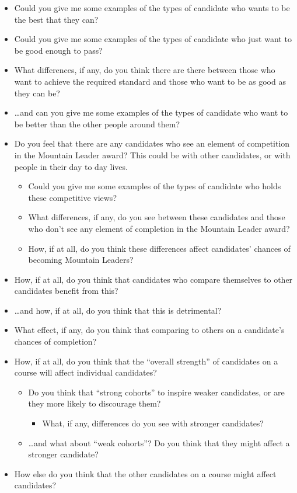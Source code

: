 \documentclass[
  12pt,
  a4paper,
]{book}
\providecommand{\tightlist}{%
  \setlength{\itemsep}{0pt}\setlength{\parskip}{0pt}}
\begin{document}
\begin{itemize}
\tightlist
\item
  Could you give me some examples of the types of candidate who wants to be the best that they can?
\item
  Could you give me some examples of the types of candidate who just want to be good enough to pass?
\item
  What differences, if any, do you think there are there between those who want to achieve the required standard and those who want to be as good as they can be?
\item
  \ldots and can you give me some examples of the types of candidate who want to be better than the other people around them?
\item
  Do you feel that there are any candidates who see an element of competition in the Mountain Leader award? This could be with other candidates, or with people in their day to day lives.

  \begin{itemize}
  \tightlist
  \item
    Could you give me some examples of the types of candidate who holds these competitive views?
  \item
    What differences, if any, do you see between these candidates and those who don't see any element of completion in the Mountain Leader award?
  \item
    How, if at all, do you think these differences affect candidates' chances of becoming Mountain Leaders?
  \end{itemize}
\item
  How, if at all, do you think that candidates who compare themselves to other candidates benefit from this?
\item
  \ldots and how, if at all, do you think that this is detrimental?
\item
  What effect, if any, do you think that comparing to others on a candidate's chances of completion?
\item
  How, if at all, do you think that the ``overall strength'' of candidates on a course will affect individual candidates?

  \begin{itemize}
  \tightlist
  \item
    Do you think that ``strong cohorts'' to inspire weaker candidates, or are they more likely to discourage them?

    \begin{itemize}
    \tightlist
    \item
      What, if any, differences do you see with stronger candidates?
    \end{itemize}
  \item
    \ldots and what about ``weak cohorts''? Do you think that they might affect a stronger candidate?
  \end{itemize}
\item
  How else do you think that the other candidates on a course might affect candidates?


\end{itemize}
\end{document}
